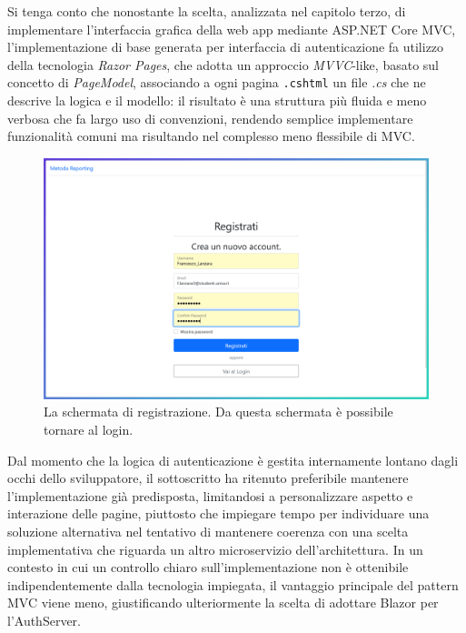 Si tenga conto che nonostante la scelta, analizzata nel capitolo terzo, di implementare l'interfaccia grafica della web app mediante ASP.NET Core MVC, l'implementazione di base generata per interfaccia di autenticazione fa utilizzo della tecnologia \emph{Razor Pages}, che adotta un approccio \emph{MVVC}-like, basato sul concetto di \emph{PageModel}, associando a ogni pagina \texttt{.cshtml} un file \emph{.cs} che ne descrive la logica e il modello: il risultato è una struttura più fluida e meno verbosa che fa largo uso di convenzioni, rendendo semplice implementare funzionalità comuni ma risultando nel complesso meno flessibile di MVC.
\begin{figure}[H]
        \centering
        \includegraphics[width=15.5cm]{fig/screen_register.png}
        \caption[Schermata registrazione]{La schermata di registrazione. Da questa schermata è possibile tornare al login.}
\end{figure}
Dal momento che la logica di autenticazione è gestita internamente lontano dagli occhi dello sviluppatore, il sottoscritto ha ritenuto preferibile mantenere l'implementazione già predisposta, limitandosi a personalizzare aspetto e interazione delle pagine, piuttosto che impiegare tempo per individuare una soluzione alternativa nel tentativo di mantenere coerenza con una scelta implementativa che riguarda un altro microservizio dell'architettura. In un contesto in cui un controllo chiaro sull'implementazione non è ottenibile indipendentemente dalla tecnologia impiegata, il vantaggio principale del pattern MVC viene meno, giustificando ulteriormente la scelta di adottare Blazor per l'AuthServer.

